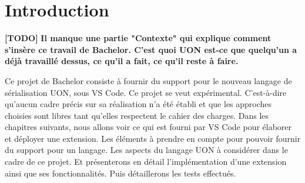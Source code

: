 \documentclass[
    iict, %
    il, %
]{heig-tb}
\begin{document}
\maketitle
\frontmatter
\clearemptydoublepage

\preamble
\let\cleardoublepage\clearpage
\authentification
\let\cleardoublepage\clearpage

\begin{abstract}
    
\end{abstract}

\listoffigures
{}
\listoflistings
{}

\tableofcontents

\printnomenclature
\clearemptydoublepage
{}

\pagestyle{fancy}
\fancyhf{}
\renewcommand\headrulewidth{1pt}

\fancyhead[L]{\itshape\nouppercase{\leftmark}}

\renewcommand{\chaptermark}[1]{\markboth{\MakeUppercase{#1}}{}}

\renewcommand\footrulewidth{1pt}


\renewcommand{\headrulewidth}{0.4pt}
\renewcommand{\footrulewidth}{0.4pt}

\titlespacing*{\chapter}{0pt}{-40pt}{20pt}


\mainmatter
\chapter{Introduction}

\textbf{[TODO]}
\textbf{Il manque une partie "Contexte" qui explique comment s'insère ce travail de Bachelor. C'est quoi UON est-ce que quelqu'un a déjà travaillé dessus, ce qu'il a fait, ce qu'il reste à faire.}

Ce projet de Bachelor consiste à fournir du support pour le nouveau langage de sérialisation UON, sous VS Code. Ce projet se veut expérimental. C'est-à-dire qu'aucun cadre précis sur sa réalisation n'a été établi et que les approches choisies sont libres tant qu'elles respectent le cahier des charges.
Dans les chapitres suivants, nous allons voir ce qui est fourni par VS Code pour élaborer et déployer une extension.
Les éléments à prendre en compte pour pouvoir fournir du support pour un langage.
Les aspects du langage UON à considérer dans le cadre de ce projet.
Et présenterons en détail l'implémentation d'une extension ainsi que ses fonctionnalités. Puis détaillerons les tests effectués.
\end{document}
